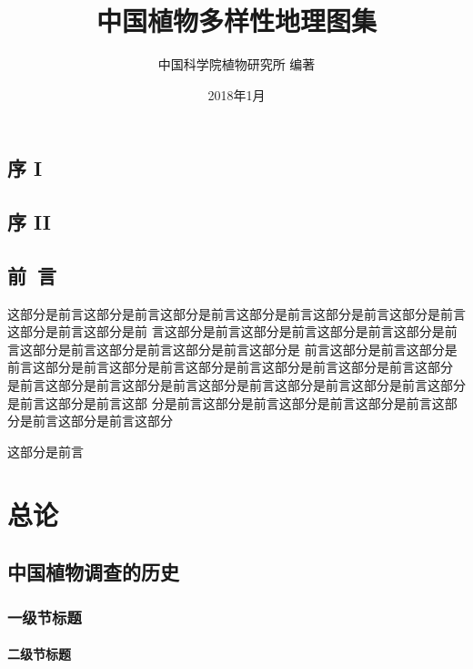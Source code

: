 \documentclass[utf8]{book}
\begin{document}
\title{\heiti 中国植物多样性地理图集}
\author{\fangsong 中国科学院植物研究所 编著}
\date{2018年1月}

\frontmatter \maketitle

\chapter{序 I}



\chapter{序 II}



\chapter{前~言}

这部分是前言这部分是前言这部分是前言这部分是前言这部分是前言这部分是前言这部分是前言这部分是前
言这部分是前言这部分是前言这部分是前言这部分是前言这部分是前言这部分是前言这部分是前言这部分是
前言这部分是前言这部分是前言这部分是前言这部分是前言这部分是前言这部分是前言这部分是前言这部分
是前言这部分是前言这部分是前言这部分是前言这部分是前言这部分是前言这部分是前言这部分是前言这部
分是前言这部分是前言这部分是前言这部分是前言这部分是前言这部分是前言这部分

这部分是前言

\renewcommand\contentsname{目~录}
\tableofcontents

\mainmatter

\part{总论}

\chapter{中国植物调查的历史}

\section{一级节标题}

\subsection{二级节标题}
\end{document}

